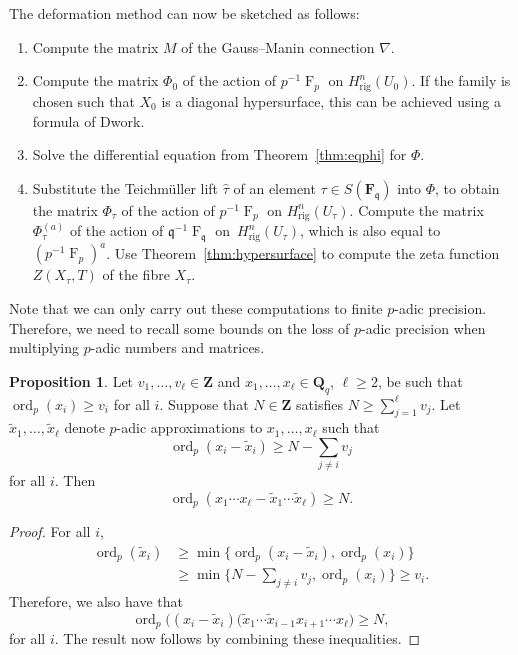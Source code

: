 \documentclass[a4paper,11pt]{article}
\numberwithin{equation}{section}
\newcommand{\ZZ}{\mathbf{Z}} %
\newcommand{\FF}{\mathbf{F}} %
\DeclareMathOperator{\ord}{ord}          %
\DeclareMathOperator{\Frob}{F}           %
\providecommand{\Hrig}{H_{\text{rig}}}  %
\theoremstyle{definition}
\newtheorem{prop}[thm]{Proposition}
\begin{document}
The deformation method can now be sketched as follows:
\begin{enumerate}[\it Step 1.]
\item Compute the matrix $M$ of the Gauss--Manin connection $\nabla$.
\item Compute the matrix $\Phi_0$ of the action of $p^{-1}\Frob_p$ on 
      $\Hrig^n(U_0)$. If the family is chosen such that $X_0$ is a diagonal 
      hypersurface, this can be achieved using a formula of Dwork.
\item Solve the differential equation from Theorem~\ref{thm:eqphi} for $\Phi$.
\item Substitute the Teichm\"uller lift $\hat{\tau}$ of an element 
      $\tau \in S(\FF_{\mathfrak{q}})$ into $\Phi$, to obtain the 
      matrix $\Phi_{\tau}$ of the action of $p^{-1}\Frob_p$ on 
      $\Hrig^n(U_{\tau})$. Compute the matrix $\Phi_{\tau}^{(a)}$ 
      of the action of $\mathfrak{q}^{-1} \Frob_{\mathfrak{q}}$ 
      on~$\Hrig^n(U_{\tau})$, which is also equal to $(p^{-1}\Frob_p)^a$.
      Use Theorem~\ref{thm:hypersurface} to compute the zeta function 
      $Z(X_{\tau},T)$ of the fibre $X_{\tau}$.
\end{enumerate}


Note that we can only carry out these computations to finite $p$-adic 
precision. Therefore, we need to recall some bounds on the loss of $p$-adic 
precision when multiplying $p$-adic numbers and matrices. 

\begin{prop} \label{prop:productval}
Let $v_1,\dotsc,v_{\ell} \in \ZZ$ and $x_1, \dotsc, x_{\ell} \in \mathbf{Q}_q$,  
$\ell \geq 2$, be such that $\ord_p(x_i) \geq v_i$ for all $i$. Suppose that 
$N \in \ZZ$ satisfies $N \geq \sum_{j=1}^{\ell} v_j$. Let 
$\tilde{x}_1, \dotsc, \tilde{x}_{\ell}$ denote $p$-adic approximations to 
$x_1, \dotsc, x_{\ell}$ such that 
\[
\ord_p(x_i - \tilde{x}_i) \geq N - \sum_{j \neq i} v_j
\] 
for all $i$.  Then 
\begin{equation*}
\ord_p(x_1 \dotsm x_{\ell} - \tilde{x}_1 \dotsm \tilde{x}_{\ell}) \geq N.
\end{equation*}
\end{prop}

\begin{proof}
For all $i$,
\begin{align*}
\ord_p(\tilde{x}_i) &\geq \min \{ \ord_p(x_i-\tilde{x}_i), \ord_p(x_i) \} \\
                    &\geq \min \{ N- \sum_{j \neq i} v_j, \ord_p(x_i)\} \geq v_i.
\end{align*}
Therefore, we also have that
\begin{equation*}
\ord_p \bigl( (x_{i}-\tilde{x}_{i})
    (\tilde{x}_1 \dotsm \tilde{x}_{i-1} x_{i+1} \dotsm x_{\ell} \bigr) \geq N,
\end{equation*}
for all $i$. The result now follows by combining these inequalities.
\end{proof}
\end{document}
